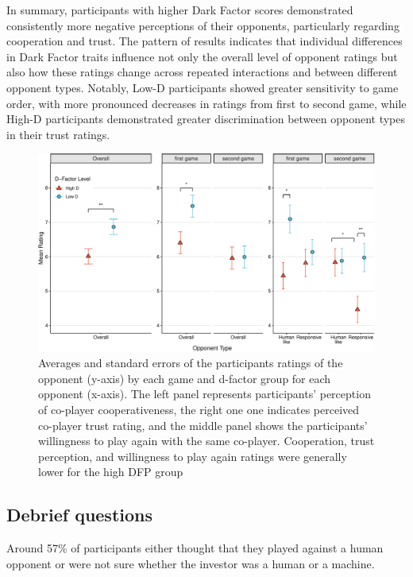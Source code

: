 \documentclass[
]{article}
\begin{document}
In summary, participants with higher Dark Factor scores demonstrated consistently more negative perceptions of their opponents, particularly regarding cooperation and trust. The pattern of results indicates that individual differences in Dark Factor traits influence not only the overall level of opponent ratings but also how these ratings change across repeated interactions and between different opponent types. Notably, Low-D participants showed greater sensitivity to game order, with more pronounced decreases in ratings from first to second game, while High-D participants demonstrated greater discrimination between opponent types in their trust ratings.

\begin{figure}[H]

{\centering \includegraphics{article_files/figure-latex/plotRatings-1} 

}

\caption{Averages and standard errors of the participants ratings of the opponent (y-axis) by each game and d-factor group for each opponent (x-axis). The left panel represents participants' perception of co-player cooperativeness, the right one one indicates perceived co-player trust rating, and the middle panel shows the participants' willingness to play again with the same co-player. Cooperation, trust perception, and willingness to play again ratings were generally lower for the high DFP group}\label{fig:plotRatings}
\end{figure}

\subsection{Debrief questions}\label{debrief-questions}

Around 57\% of participants either thought that they played against a human opponent or were not sure whether the investor was a human or a machine.
\end{document}
